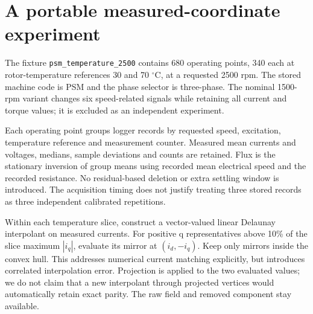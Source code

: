\section{A portable measured-coordinate experiment}
The fixture \texttt{psm\_temperature\_2500} contains 680 operating points,
340 each at rotor-temperature references 30 and 70 $^\circ$C, at a requested
2500 rpm. The stored machine code is PSM and the phase selector is three-phase.
The nominal 1500-rpm variant changes six speed-related signals while retaining
all current and torque values; it is excluded as an independent experiment.

Each operating point groups logger records by requested speed, excitation,
temperature reference and measurement counter. Measured mean currents and
voltages, medians, sample deviations and counts are retained. Flux is the
stationary inversion of group means using recorded mean electrical speed and
the recorded resistance. No residual-based deletion or extra settling window
is introduced. The acquisition timing does not justify treating three stored
records as three independent calibrated repetitions.

Within each temperature slice, construct a vector-valued linear Delaunay
interpolant on measured currents. For positive q representatives above
10\% of the slice maximum $|i_q|$, evaluate its mirror at $(i_d,-i_q)$.
Keep only mirrors inside the convex hull. This addresses numerical current
matching explicitly, but introduces correlated interpolation error.
Projection is applied to the two evaluated values; we do not claim that a new
interpolant through projected vertices would automatically retain exact parity.
The raw field and removed component stay available.
